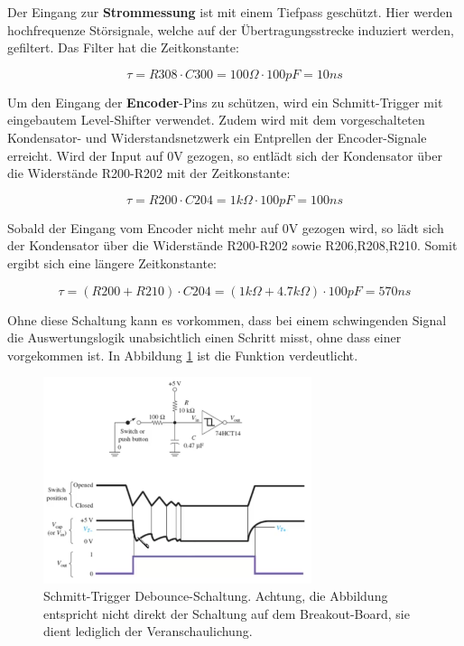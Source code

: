 
Der Eingang zur \textbf{Strommessung} ist mit einem Tiefpass geschützt. Hier werden hochfrequenze Störsignale, welche auf der Übertragungsstrecke induziert werden, gefiltert. Das Filter hat die Zeitkonstante:

\begin{equation}
\tau = R308 \cdot C300 = 100\Omega \cdot 100pF = 10ns
\end{equation}


Um den Eingang der \textbf{Encoder}-Pins zu schützen, wird ein Schmitt-Trigger mit eingebautem Level-Shifter verwendet. Zudem wird mit dem vorgeschalteten Kondensator- und Widerstandsnetzwerk ein Entprellen der Encoder-Signale erreicht. Wird der Input auf 0V gezogen, so entlädt sich der Kondensator über die Widerstände R200-R202 mit der Zeitkonstante:

\begin{equation}
\tau = R200 \cdot C204 = 1k\Omega \cdot 100pF = 100ns
\end{equation}

Sobald der Eingang vom Encoder nicht mehr auf 0V gezogen wird, so lädt sich der Kondensator über die Widerstände R200-R202 sowie R206,R208,R210. Somit ergibt sich eine längere Zeitkonstante:

\begin{equation}
\tau = (R200 + R210) \cdot C204 = (1k\Omega + 4.7k\Omega) \cdot 100pF = 570ns
\end{equation}

Ohne diese Schaltung kann es vorkommen, dass bei einem schwingenden Signal die Auswertungslogik unabsichtlich einen Schritt misst, ohne dass einer vorgekommen ist. In Abbildung \ref{fig:Schmitt_Trigger_Debounce} ist die Funktion verdeutlicht.

\begin{figure}[H]
	\centering
	\includegraphics[width=0.7\textwidth]{graphics/Schmitt_Trigger_Debounce}
	\caption{Schmitt-Trigger Debounce-Schaltung. Achtung, die Abbildung entspricht nicht direkt der Schaltung auf dem Breakout-Board, sie dient lediglich der Veranschaulichung. \cite[3:00]{kleitz_sec_2011}}
	\label{fig:Schmitt_Trigger_Debounce}
\end{figure} 

